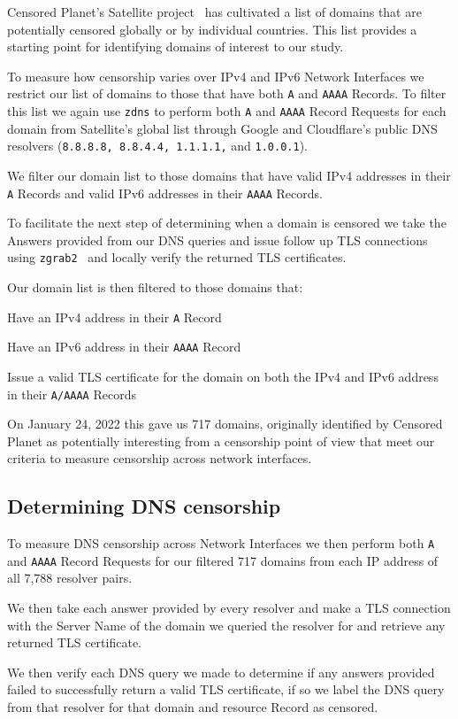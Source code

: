 Censored Planet's Satellite project~\cite{sundara2020censored} has cultivated a
list of domains that are potentially censored globally or by individual
countries. This list provides a starting point for identifying domains of
interest to our study.

To measure how censorship varies over IPv4 and IPv6 Network Interfaces we
restrict our list of domains to those that have both \texttt{A} and
\texttt{AAAA} Records. To filter this list we again use \texttt{zdns} to perform
both \texttt{A} and \texttt{AAAA} Record Requests for each domain from
Satellite's global list through Google and Cloudflare's public DNS resolvers
(\texttt{8.8.8.8, 8.8.4.4, 1.1.1.1,} and \texttt{1.0.0.1}).

We filter our domain list to those domains that have valid IPv4 addresses in
their \texttt{A} Records and valid IPv6 addresses in their \texttt{AAAA}
Records.

To facilitate the next step of determining when a domain is censored we take the
Answers provided from our DNS queries and issue follow up TLS connections using
\texttt{zgrab2}~\cite{Durumeric13zmap} and locally verify the returned TLS
certificates.

Our domain list is then filtered to those domains that:
\begin{packed_enumerate}
    \item Have an IPv4 address in their \texttt{A} Record
    \item Have an IPv6 address in their \texttt{AAAA} Record
    \item Issue a valid TLS certificate for the domain on both the IPv4 and IPv6
    address in their \texttt{A/AAAA} Records
\end{packed_enumerate}

On January 24, 2022 this gave us 717 domains, originally identified by Censored
Planet as potentially interesting from a censorship point of view that meet our
criteria to measure censorship across network interfaces.

\subsection{Determining DNS censorship}\label{sec:methodology:censorship}

To measure DNS censorship across Network Interfaces we then perform both
\texttt{A} and \texttt{AAAA} Record Requests for our filtered 717 domains from
each IP address of all 7,788 resolver pairs.

We then take each answer provided by every resolver and make a TLS connection
with the Server Name of the domain we queried the resolver for and retrieve any
returned TLS certificate.

We then verify each DNS query we made to determine if any answers provided
failed to successfully return a valid TLS certificate, if so we label the DNS
query from that resolver for that domain and resource Record as censored.
